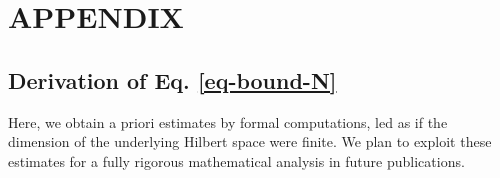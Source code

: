\documentclass[a4paper, 11pt]{article}
\begin{document}






\section*{APPENDIX}
\label{apdx}
\subsection{Derivation of Eq. \eqref{eq-bound-N}}
Here, we obtain a priori estimates by formal computations,
led as if the dimension of the underlying Hilbert space
were finite. We plan to exploit these estimates for a fully
rigorous mathematical analysis in future publications.
\end{document}
